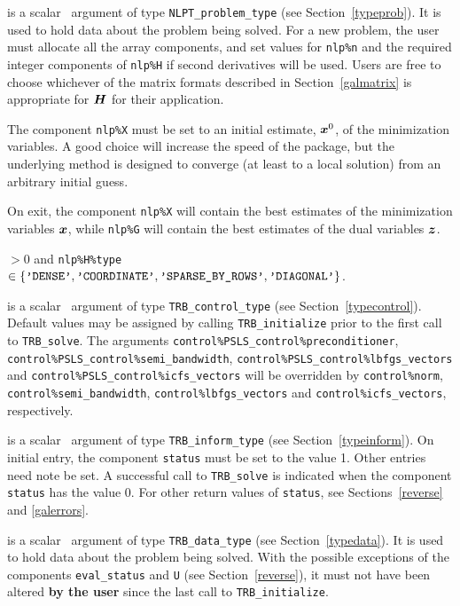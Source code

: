 \documentclass{galahad}
\newcommand{\packagename}{TRB}
\begin{document}
\vspace*{-2mm}
\begin{description}
 is a scalar \intentinout\ argument of type
{\tt NLPT\_problem\_type}
(see Section~\ref{typeprob}).
It is used to hold data about the problem being solved.
For a new problem, the user must allocate all the array components,
and set values for {\tt nlp\%n}
and the required integer components of {\tt nlp\%H} if second derivatives
will be used.
Users are free to choose whichever
of the matrix formats described in Section~\ref{galmatrix}
is appropriate for ${\bm{H}}$ for their application.

\noindent
The component {\tt nlp\%X} must be set to an initial estimate, ${\bm{x}}^{0}$,
of the minimization variables. A good choice will increase the speed
of the package, but the underlying method is designed to converge (at least
to a local solution) from an arbitrary initial guess.

\noindent
On exit, the component {\tt nlp\%X} will contain the best estimates of the
minimization variables ${\bm{x}}$, while {\tt nlp\%G} will contain the best 
estimates of the dual variables ${\bm{z}}$.

\noindent
{} $> 0$ and
{\tt nlp\%H\%type} $\in \{
  \mbox{\tt 'DENSE'}, \mbox{\tt 'COORDINATE'}, \mbox{\tt 'SPARSE\_BY\_ROWS'},
  \mbox{\tt 'DIAGONAL'} \}$.

 is a scalar \intentin\ argument of type
{\tt \packagename\_control\_type}
(see Section~\ref{typecontrol}). Default values may be assigned by calling
{\tt \packagename\_initialize} prior to the first call to
{\tt \packagename\_solve}. The arguments
{\tt control\%PSLS\_control\-\%preconditioner},
{\tt control\%PSLS\_control\%semi\_bandwidth},
{\tt control\%PSLS\_control\%lbfgs\_vectors} and
{\tt control\%PSLS\_control\%icfs\_vectors}
will be overridden by
{\tt control\%norm},
{\tt control\%semi\_bandwidth},
{\tt control\%lbfgs\_vectors} and
{\tt control\%icfs\_vectors}, respectively.

 is a scalar \intentinout\ argument of type
{\tt \packagename\_inform\_type}
(see Section~\ref{typeinform}).
On initial entry, the  component {\tt status} must be set to the value 1.
Other entries need note be set.
A successful call to
{\tt \packagename\_solve}
is indicated when the  component {\tt status} has the value 0.
For other return values of {\tt status}, see Sections~\ref{reverse} and
\ref{galerrors}.

 is a scalar \intentinout\ argument of type
{\tt \packagename\_data\_type}
(see Section~\ref{typedata}). It is used to hold data about the problem being
solved. With the possible exceptions of the components
{\tt eval\_status} and {\tt U} (see Section~\ref{reverse}),
it must not have been altered {\bf by the user} since the last call to
{\tt \packagename\_initialize}.


\end{description}
\end{document}
